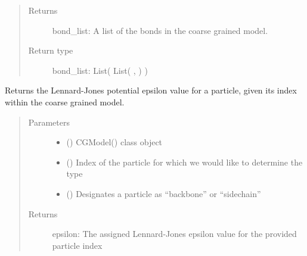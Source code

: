 \documentclass[letterpaper,12pt,english,openany,oneside]{sphinxmanual}
\begin{document}
\begin{fulllineitems}
\begin{fulllineitems}
\begin{quote}
\begin{description}
\item[{Returns}] \leavevmode
bond\_list: A list of the bonds in the coarse grained model.

\item[{Return type}] \leavevmode
bond\_list: List( List( ,  ) )

\end{description}\end{quote}

\end{fulllineitems}


\begin{fulllineitems}
\label{\detokenize{cg_model:cg_model.cgmodel.CGModel.get_epsilon}}
Returns the Lennard-Jones potential epsilon value for a particle, given its index within the coarse grained model.
\begin{quote}\begin{description}
\item[{Parameters}] \leavevmode\begin{itemize}
\item {} 
 () \textendash{} CGModel() class object

\item {} 
 () \textendash{} Index of the particle for which we would like to determine the type

\item {} 
 () \textendash{} Designates a particle as “backbone” or “sidechain”

\end{itemize}

\item[{Returns}] \leavevmode
epsilon: The assigned Lennard-Jones epsilon value for the provided particle index


\end{description}
\end{quote}
\end{fulllineitems}
\end{fulllineitems}
\end{document}
